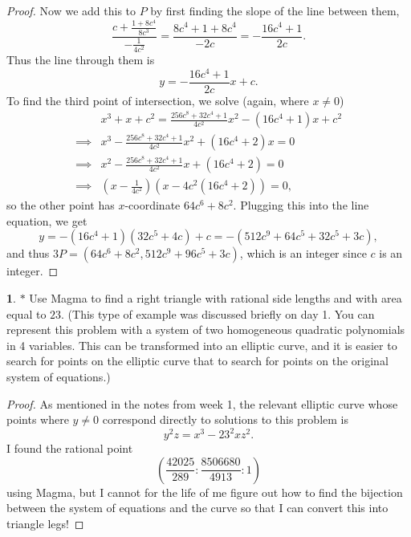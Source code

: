 \documentclass[12pt]{article}
\theoremstyle{definition}
\newtheorem{ex}{}
\begin{document}
\begin{proof}
	Now we add this to $P$ by first finding the slope of the line between them, \begin{equation*}
		\frac{c + \frac{1 + 8c^4}{8c^3}}{-\frac{1}{4c^2}} = \frac{8c^4 + 1 + 8c^4}{-2c} = -\frac{16c^4 + 1}{2c}.
	\end{equation*}
	Thus the line through them is \begin{equation*}
		y = -\frac{16c^4 + 1}{2c}x + c.
	\end{equation*}
	To find the third point of intersection, we solve (again, where $x \neq 0$) \begin{align*}
		         & x^3 + x + c^2 = \frac{256c^8 + 32c^4 + 1}{4c^2}x^2 - (16c^4 + 1)x + c^2 \\
		\implies & x^3 - \frac{256c^8 + 32c^4 + 1}{4c^2}x^2 + (16c^4 + 2)x = 0             \\
		\implies & x^2 - \frac{256c^8 + 32c^4 + 1}{4c^2}x + (16c^4 + 2) = 0                \\
		\implies & \left(x - \frac{1}{4c^2}\right)\left( x - 4c^2(16c^4 + 2) \right) = 0,
	\end{align*}
	so the other point has $x$-coordinate $64c^6+8c^2$.
	Plugging this into the line equation, we get \begin{equation*}
		y = -(16c^4+1)(32c^5+4c) + c = -(512c^9 + 64c^5 + 32c^5 + 3c),
	\end{equation*}
	and thus $3P = (64c^6 + 8c^2, 512c^9 + 96c^5 + 3c)$, which is an integer since $c$ is an integer.
\end{proof}

\begin{ex}
	$*$ Use Magma to find a right triangle with rational side lengths and with area equal to $23$. (This type of example was discussed briefly on day 1. You can represent this problem with a system of two homogeneous quadratic polynomials in 4 variables. This can be transformed into an elliptic curve, and it is easier to search for points on the elliptic curve that to search for points on the original system of equations.)
\end{ex}
\begin{proof}
  As mentioned in the notes from week 1, the relevant elliptic curve whose points where $y \neq 0$ correspond directly to solutions to this problem is \begin{equation*}
    y^2z = x^3 - 23^2xz^2.
  \end{equation*}
  I found the rational point \begin{equation*}
    \left(\frac{42025}{289} : \frac{8506680}{4913} : 1 \right)
  \end{equation*}
  using Magma, but I cannot for the life of me figure out how to find the bijection between the system of equations and the curve so that I can convert this into triangle legs!
\end{proof}
\end{document}
